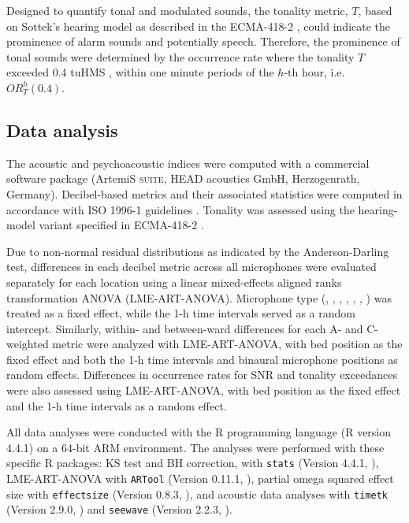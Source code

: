 Designed to quantify tonal and modulated sounds, the tonality metric, $T$, based on Sottek’s hearing model as described in the ECMA-418-2 \citep{International2020}, could indicate the prominence of alarm sounds and potentially speech. Therefore, the prominence of tonal sounds were determined by the occurrence rate where the tonality $T$ exceeded 0.4 tuHMS \citep{International2020}, within one minute periods of the $h$-th hour, i.e. $\textit{OR}^h_T(0.4)$.

\subsection{Data analysis}

The acoustic and psychoacoustic indices were computed with a commercial software package (ArtemiS \textsc{suite}, HEAD acoustics GmbH, Herzogenrath, Germany). Decibel-based metrics and their associated statistics were computed in accordance with ISO 1996-1 guidelines \citep{ISO1996-1}. Tonality was assessed using the hearing-model variant specified in ECMA-418-2 \citet{International2020}.

Due to non-normal residual distributions as indicated by the Anderson-Darling test, differences in each decibel metric across all microphones were evaluated separately for each location using a linear mixed-effects aligned ranks transformation ANOVA (LME-ART-ANOVA). Microphone type (\HDGRAS, \HDbinL, \HDbinR, \NICUGRASIn, \NICUGRASOut, \NICUbinL, \NICUbinR) was treated as a fixed effect, while the \num{1}-\si{\hour} time intervals served as a random intercept. Similarly, within- and between-ward differences for each A- and C-weighted metric were analyzed with LME-ART-ANOVA, with bed position as the fixed effect and both the \num{1}-\si{\hour} time intervals and binaural microphone positions as random effects. Differences in occurrence rates for SNR and tonality exceedances were also assessed using LME-ART-ANOVA, with bed position as the fixed effect and the \num{1}-\si{\hour} time intervals as a random effect.

All data analyses were conducted with the R programming language (R version 4.4.1) \citep{RCoreTeam2023} on a 64-bit ARM environment. The analyses were performed with these specific R packages: KS test and BH correction, with \texttt{stats} (Version 4.4.1, \citet{RCoreTeam2023}), LME-ART-ANOVA with \texttt{ARTool} (Version 0.11.1, \citet{Kay2021}), partial omega squared effect size with \texttt{effectsize} (Version 0.8.3, \citet{Ben-Shachar2020}), and acoustic data analyses with \texttt{timetk} (Version 2.9.0, \citet{dancho_timetk_2023}) and \texttt{seewave} (Version 2.2.3, \citet{sueur_seewave_2008}).


